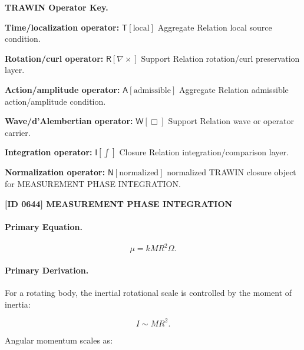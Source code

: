 \par\vspace{0.45\baselineskip}
\noindent\begin{minipage}[t]{\linewidth}
\begingroup
\small
\raggedright
\textbf{TRAWIN Operator Key.}\par
\noindent\textbf{Time/localization operator:} $\mathsf{T}\!\left[\mathrm{local}\right]$ Aggregate Relation local source condition.\par
\noindent\textbf{Rotation/curl operator:} $\mathsf{R}\!\left[\nabla\times\right]$ Support Relation rotation/curl preservation layer.\par
\noindent\textbf{Action/amplitude operator:} $\mathsf{A}\!\left[\mathrm{admissible}\right]$ Aggregate Relation admissible action/amplitude condition.\par
\noindent\textbf{Wave/d'Alembertian operator:} $\mathsf{W}\!\left[\Box\right]$ Support Relation wave or operator carrier.\par
\noindent\textbf{Integration operator:} $\mathsf{I}\!\left[\int\right]$ Closure Relation integration/comparison layer.\par
\noindent\textbf{Normalization operator:} $\mathsf{N}\!\left[\mathrm{normalized}\right]$ normalized TRAWIN closure object for MEASUREMENT PHASE INTEGRATION.\par
\endgroup
\end{minipage}

\clearpage
\noindent\textbf{[ID 0644] MEASUREMENT PHASE INTEGRATION}\par
\vspace{0.35em}
\paragraph{Primary Equation.}
\begin{equation}
\mu
=
kMR^2\Omega .
\end{equation}

\paragraph{Primary Derivation.}
For a rotating body, the inertial rotational scale is controlled by the moment of inertia:

\begin{equation}
I
\sim
MR^2 .
\end{equation}

Angular momentum scales as:

